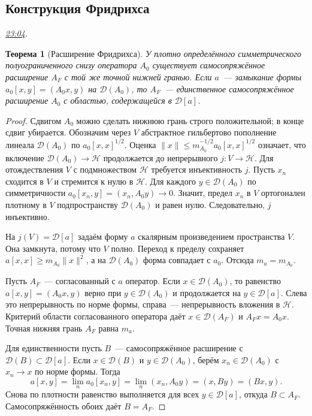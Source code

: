 \documentclass[11pt,a4paper]{article}
\theoremstyle{plain}
\newtheorem{theorem}{Теорема}[section]
\theoremstyle{definition}
\newcommand{\Hh}{\mathcal H}
\newcommand{\Dom}{\mathcal D}
\newcommand{\norm}[1]{\lVert#1\rVert}
\newcommand{\at}[3]{\href{https://www.youtube.com/watch?v=#1&t=#2s}{#3}}
\newcommand{\topic}[2]{\Needspace{5\baselineskip}\subsection*{#1}\noindent\emph{#2.}\par\nobreak\smallskip}
\begin{document}
\topic{Конструкция Фридрихса}{\at{E-jM7sTmSKc}{1384}{23:04}}
\begin{theorem}[Расширение Фридрихса]
У плотно определённого симметрического полуограниченного
снизу оператора $A_0$ существует самосопряжённое
расширение $A_F$ с той же точной нижней гранью.
Если $a$~--- замыкание формы $a_0[x,y]=(A_0x,y)$
на $\Dom(A_0)$, то $A_F$~--- единственное
самосопряжённое расширение $A_0$ с областью,
содержащейся в $\Dom[a]$.
\end{theorem}
\begin{proof}
Сдвигом $A_0$ можно сделать нижнюю грань строго
положительной; в конце сдвиг убирается. Обозначим
через $V$ абстрактное гильбертово пополнение
линеала $\Dom(A_0)$ по $a_0[x,x]^{1/2}$.
Оценка $\norm x\le m_{A_0}^{-1/2}a_0[x,x]^{1/2}$
означает, что включение $\Dom(A_0)\to\Hh$ продолжается
до непрерывного $j:V\to\Hh$. Для отождествления
$V$ с подмножеством $\Hh$ требуется инъективность $j$.
Пусть $x_n$ сходится в $V$ и стремится к нулю в $\Hh$.
Для каждого $y\in\Dom(A_0)$ по симметричности
$a_0[x_n,y]=(x_n,A_0y)\to0$. Значит, предел $x_n$ в $V$
ортогонален плотному в $V$ подпространству $\Dom(A_0)$
и равен нулю. Следовательно, $j$ инъективно.

На $j(V)=\Dom[a]$ задаём
форму $a$ скалярным произведением пространства $V$.
Она замкнута, потому что $V$ полно. Переход к пределу
сохраняет $a[x,x]\ge m_{A_0}\norm x^2$, а на
$\Dom(A_0)$ форма совпадает с $a_0$. Отсюда
$m_a=m_{A_0}$.

Пусть $A_F$~--- согласованный с $a$ оператор.
Если $x\in\Dom(A_0)$, то равенство $a[x,y]=(A_0x,y)$
верно при $y\in\Dom(A_0)$ и продолжается на
$y\in\Dom[a]$. Слева это непрерывность по норме формы,
справа~--- непрерывность вложения в $\Hh$.
Критерий области согласованного оператора даёт
$x\in\Dom(A_F)$ и $A_F x=A_0x$.
Точная нижняя грань $A_F$ равна $m_a$.

Для единственности пусть $B$~--- самосопряжённое
расширение с $\Dom(B)\subset\Dom[a]$.
Если $x\in\Dom(B)$ и $y\in\Dom(A_0)$, берём
$x_n\in\Dom(A_0)$ с $x_n\to x$ по норме формы.
Тогда
\[
 a[x,y]=\lim_n a_0[x_n,y]=\lim_n(x_n,A_0y)
       =(x,By)=(Bx,y).
\]
Снова по плотности равенство выполняется для всех
$y\in\Dom[a]$, откуда $B\subset A_F$. Самосопряжённость
обоих даёт $B=A_F$.
\end{proof}
\end{document}
